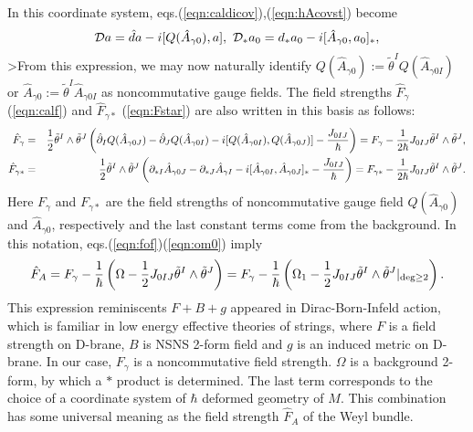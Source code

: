 \documentclass[10pt,a4paper]{article}
\def\h{\hbar}
\def\hA{{\hat A}}
\begin{document}
In this coordinate system, eqs.(\ref{eqn:caldicov}),(\ref{eqn:hAcovst}) become 
\begin{equation}
{\cal D}a={\hat d}a-i[Q(\hA_{\gamma0}),a],\ {\cal D}_*a_0=d_*a_0-i[\hA_{\gamma0},a_0]_*,
\end{equation}
>From this expression, we may now naturally identify $Q(\hA_{\gamma0}):={\tilde \theta}^IQ(\hA_{\gamma0I})$ or $\hA_{\gamma0}:={\tilde \theta}^I\hA_{\gamma0I}$ as noncommutative gauge fields. The field strengths ${\hat F}_\gamma$ (\ref{eqn:calf}) and ${\hat F}_{\gamma*}$ (\ref{eqn:Fstar}) are also written in this basis as follows:
\begin{eqnarray}
\label{eqn:Fnorm}
{\hat F}_\gamma&=&{1\over2}{\tilde \theta}^I\wedge{\tilde \theta}^J\left({\hat \partial}_IQ(\hA_{\gamma0J})-{\hat \partial}_JQ(\hA_{\gamma0I})-i[Q(\hA_{\gamma0I}),Q(\hA_{\gamma0J})]-{J_{0IJ}\over\h}\right)
=F_\gamma-{1\over2\h}J_{0IJ}{\tilde \theta}^I\wedge{\tilde \theta}^J,\nonumber\\
{\hat F}_{\gamma*}&=&{1\over2}{\tilde \theta}^I\wedge{\tilde \theta}^J\left(\partial_{*I}\hA_{\gamma0J}-\partial_{*J}\hA_{\gamma I}-i[\hA_{\gamma0I},\hA_{\gamma0J}]_*-{J_{0IJ}\over\h}\right)
=F_{\gamma*}-{1\over2\h}J_{0IJ}{\tilde \theta}^I\wedge{\tilde \theta}^J.
\end{eqnarray}
Here $F_\gamma$ and $F_{\gamma*}$ are the field strengths of noncommutative gauge field $Q(\hA_{\gamma0})$ and $\hA_{\gamma0}$, respectively and the last constant terms come from the background. 
In this notation, eqs.(\ref{eqn:fof})(\ref{eqn:om0}) imply
\begin{equation}
\label{eqn:fagamm}
{\hat F}_A=F_\gamma-{1\over\h}\left(\Omega-\frac12 J_{0IJ}{\tilde \theta}^I\wedge{\tilde \theta}^J\right)=F_\gamma-{1\over\h}\left(\Omega_1-\frac12 J_{0IJ}{\tilde \theta}^I\wedge{\tilde \theta}^J|_{{\rm deg}\geq2}\right).
\end{equation}
This expression reminiscents $F+B+g$ appeared in Dirac-Born-Infeld action, which is familiar in low energy effective theories of strings, where $F$ is a field strength on D-brane, $B$ is NSNS 2-form field and $g$ is an induced metric on D-brane. In our case, $F_\gamma$ is a noncommutative field strength. $\Omega$ is a background 2-form, by which a $*$ product is determined. The last term corresponds to the choice of a coordinate system of $\h$ deformed geometry of $M$. This combination has some universal meaning as the field strength ${\hat F}_A$ of the Weyl bundle.\\
\end{document}
